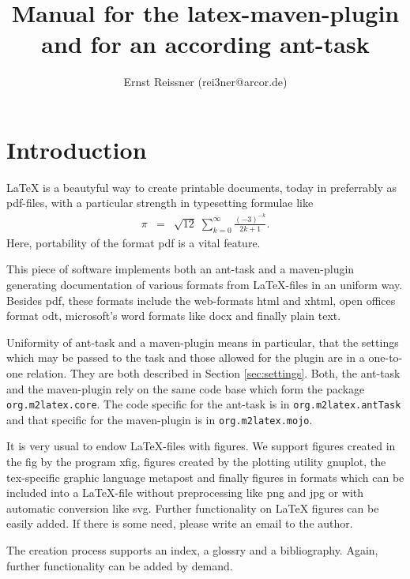 \documentclass[12pt]{article}
\title{Manual for the latex-maven-plugin and for an according ant-task }
\author{Ernst Reissner (rei3ner@arcor.de)}
\begin{document}
\maketitle

\tableofcontents
\listoffigures
\listoftables


\section{Introduction}

\LaTeX{} is a beautyful way to create printable documents, 
today in preferrably as \gls{pdf}-files, 
with a particular strength in typesetting formulae like 
%
\begin{eqnarray*}
\pi & = & \sqrt{12}\;\sum^\infty_{k=0} \frac{(-3)^{-k}}{2k+1}. 
\end{eqnarray*}
%
Here, portability of the format \gls{pdf} is a vital feature. 

This piece of software implements both an ant-task and a maven-plugin 
generating documentation of various formats from \LaTeX-files 
in an uniform way. 
Besides \gls{pdf}, these formats include the web-formats \gls{html} 
and \gls{xhtml}, 
open offices format \gls{odt}, microsoft's word formats like \gls{docx} 
and finally plain text. 

Uniformity of ant-task and a maven-plugin means in particular, 
that the settings which may be passed to the task 
and those allowed for the plugin are in a one-to-one relation. 
They are both described in Section \ref{sec:settings}. 
Both, the ant-task and the maven-plugin rely on the same code base 
which form the package {\tt org.m2latex.core}. 
The code specific for the ant-task is in {\tt org.m2latex.antTask} 
and that specific for the maven-plugin is in {\tt org.m2latex.mojo}. 

It is very usual to endow \LaTeX-files with figures. 
We support figures created in the \gls{fig} by the program xfig, 
figures created by the plotting utility gnuplot, 
the tex-specific graphic language metapost 
and finally figures in formats which can be included into a \LaTeX-file 
without preprocessing like \gls{png} and \gls{jpg} 
or with automatic conversion like \gls{svg}. 
Further functionality on \LaTeX{} figures can be easily added. 
If there is some need, please write an email to the author. 

The creation process supports an index, a glossry and a bibliography. 
Again, further functionality can be added by demand. 
\end{document}
